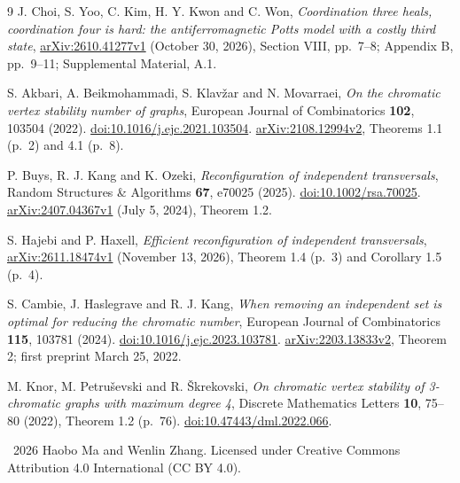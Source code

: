 \documentclass[11pt]{article}
\begin{document}
\begin{thebibliography}{9}
J. Choi, S. Yoo, C. Kim, H. Y. Kwon and C. Won,
\emph{Coordination three heals, coordination four is hard: the
antiferromagnetic Potts model with a costly third state},
\href{https://arxiv.org/abs/2610.41277v1}{arXiv:2610.41277v1}
(October 30, 2026), Section VIII, pp.~7--8; Appendix B, pp.~9--11;
Supplemental Material, A.1.

S. Akbari, A. Beikmohammadi, S. Klav\v{z}ar and N. Movarraei,
\emph{On the chromatic vertex stability number of graphs},
European Journal of Combinatorics \textbf{102}, 103504 (2022).
\href{https://doi.org/10.1016/j.ejc.2021.103504}{doi:10.1016/j.ejc.2021.103504}.
\href{https://arxiv.org/abs/2108.12994v2}{arXiv:2108.12994v2},
Theorems 1.1 (p.~2) and 4.1 (p.~8).

P. Buys, R. J. Kang and K. Ozeki,
\emph{Reconfiguration of independent transversals},
Random Structures \& Algorithms \textbf{67}, e70025 (2025).
\href{https://doi.org/10.1002/rsa.70025}{doi:10.1002/rsa.70025}.
\href{https://arxiv.org/abs/2407.04367v1}{arXiv:2407.04367v1}
(July 5, 2024), Theorem 1.2.

S. Hajebi and P. Haxell,
\emph{Efficient reconfiguration of independent transversals},
\href{https://arxiv.org/abs/2611.18474v1}{arXiv:2611.18474v1}
(November 13, 2026), Theorem 1.4 (p.~3) and Corollary 1.5 (p.~4).

S. Cambie, J. Haslegrave and R. J. Kang,
\emph{When removing an independent set is optimal for reducing the
chromatic number}, European Journal of Combinatorics \textbf{115},
103781 (2024).
\href{https://doi.org/10.1016/j.ejc.2023.103781}{doi:10.1016/j.ejc.2023.103781}.
\href{https://arxiv.org/abs/2203.13833v2}{arXiv:2203.13833v2},
Theorem 2; first preprint March 25, 2022.

M. Knor, M. Petru\v{s}evski and R. \v{S}krekovski,
\emph{On chromatic vertex stability of 3-chromatic graphs with
maximum degree 4}, Discrete Mathematics Letters \textbf{10},
75--80 (2022), Theorem 1.2 (p.~76).
\href{https://doi.org/10.47443/dml.2022.066}{doi:10.47443/dml.2022.066}.
\end{thebibliography}

\medskip
\noindent\small
\textcopyright\ 2026 Haobo Ma and Wenlin Zhang.
Licensed under Creative Commons Attribution 4.0 International (CC BY 4.0).
\end{document}
